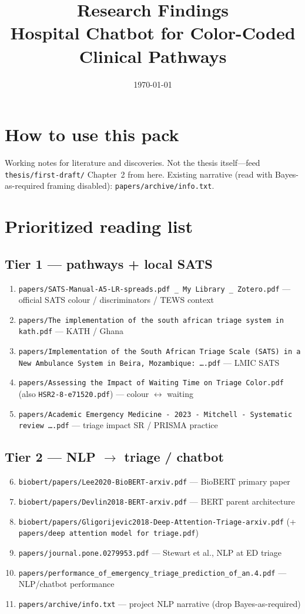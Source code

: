 \documentclass[11pt,a4paper]{article}
\title{Research Findings\\[0.4em]\large Hospital Chatbot for Color-Coded Clinical Pathways}
\author{}
\date{\today}
\begin{document}
\maketitle

\section*{How to use this pack}
Working notes for literature and discoveries. Not the thesis itself---feed \texttt{thesis/first-draft/} Chapter~2 from here.
Existing narrative (read with Bayes-as-required framing disabled): \texttt{papers/archive/info.txt}.

\section{Prioritized reading list}

\subsection*{Tier 1 --- pathways + local SATS}
\begin{enumerate}
  \item \texttt{papers/SATS-Manual-A5-LR-spreads.pdf \_ My Library \_ Zotero.pdf} --- official SATS colour / discriminators / TEWS context
  \item \texttt{papers/The implementation of the south african triage system in kath.pdf} --- KATH / Ghana
  \item \texttt{papers/Implementation of the South African Triage Scale (SATS) in a New Ambulance System in Beira, Mozambique: \ldots.pdf} --- LMIC SATS
  \item \texttt{papers/Assessing the Impact of Waiting Time on Triage Color.pdf} (also \texttt{HSR2-8-e71520.pdf}) --- colour $\leftrightarrow$ waiting
  \item \texttt{papers/Academic Emergency Medicine - 2023 - Mitchell - Systematic review \ldots.pdf} --- triage impact SR / PRISMA practice
\end{enumerate}

\subsection*{Tier 2 --- NLP $\to$ triage / chatbot}
\begin{enumerate}
  \setcounter{enumi}{5}
  \item \texttt{biobert/papers/Lee2020-BioBERT-arxiv.pdf} --- BioBERT primary paper
  \item \texttt{biobert/papers/Devlin2018-BERT-arxiv.pdf} --- BERT parent architecture
  \item \texttt{biobert/papers/Gligorijevic2018-Deep-Attention-Triage-arxiv.pdf} (+ \texttt{papers/deep attention model for triage.pdf})
  \item \texttt{papers/journal.pone.0279953.pdf} --- Stewart et al., NLP at ED triage
  \item \texttt{papers/performance\_of\_emergency\_triage\_prediction\_of\_an.4.pdf} --- NLP/chatbot performance
  \item \texttt{papers/archive/info.txt} --- project NLP narrative (drop Bayes-as-required)
\end{enumerate}
\end{document}
